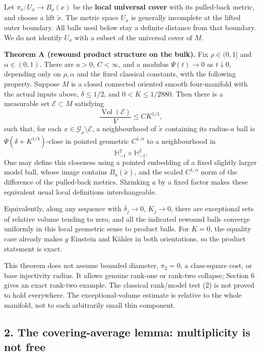 \documentclass[
  11pt,
]{article}
\begin{document}
Let \(\pi_x:U_x\to B_\rho(x)\) be the \textbf{local universal cover}
with its pulled-back metric, and choose a lift \(\widetilde x\). The
metric space \(U_x\) is generally incomplete at the lifted outer
boundary. All balls used below stay a definite distance from that
boundary. We do not identify \(U_x\) with a subset of the universal
cover of \(M\).

\textbf{Theorem A (rewound product structure on the bulk).} Fix
\(\rho\in(0,1]\) and \(\alpha\in(0,1)\). There are \(a>0\),
\(C<\infty\), and a modulus \(\Psi(t)\to0\) as \(t\downarrow0\),
depending only on \(\rho,\alpha\) and the fixed classical constants,
with the following property. Suppose \(M\) is a closed connected
oriented smooth four-manifold with the actual inputs above,
\(\delta\le1/2\), and \(0<K\le1/2880\). Then there is a measurable set
\(\mathcal E\subset M\) satisfying \[
                  \frac{\operatorname{Vol}(\mathcal E)}{V}
                         \le C K^{1/4},                 \tag{3}
\] such that, for each \(x\in\mathcal G_\rho\setminus\mathcal E\), a
neighbourhood of \(\widetilde x\) containing its radius-\(a\) ball is
\(\Psi(\delta+K^{1/4})\)-close in pointed geometric \(C^{1,\alpha}\) to
a neighbourhood in \[
                         \mathbb H^2_{-1}\times\mathbb H^2_{-1}.
 \tag{4}
\] One may define this closeness using a pointed embedding of a fixed
slightly larger model ball, whose image contains \(B_a(\widetilde x)\),
and the scaled \(C^{1,\alpha}\) norm of the difference of the
pulled-back metrics. Shrinking \(a\) by a fixed factor makes these
equivalent usual local definitions interchangeable.

Equivalently, along any sequence with \(\delta_j\to0\), \(K_j\to0\),
there are exceptional sets of relative volume tending to zero, and all
the indicated rewound balls converge uniformly in this local geometric
sense to product balls. For \(K=0\), the equality case already makes
\(g\) Einstein and Kähler in both orientations, so the product statement
is exact.

This theorem does not assume bounded diameter, \(\pi_2=0\), a
class-square cost, or base injectivity radius. It allows genuine
rank-one or rank-two collapse; Section 6 gives an exact rank-two
example. The classical rank/model test (2) is not proved to hold
everywhere. The exceptional-volume estimate is relative to the whole
manifold, not to each arbitrarily small thin component.

\hypertarget{the-covering-average-lemma-multiplicity-is-not-free}{%
\subsection{2. The covering-average lemma: multiplicity is not
free}\label{the-covering-average-lemma-multiplicity-is-not-free}}
\end{document}
